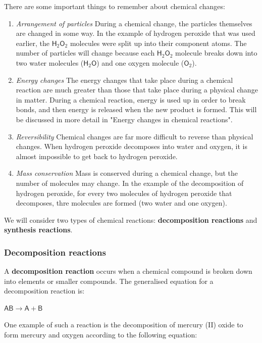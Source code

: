       \label{m38709*id62865}There are some important things to remember about chemical changes:\par 
      \label{m38709*id62869}\begin{enumerate}[noitemsep, label=\textbf{\arabic*}. ] 
            \label{m38709*uid6}\item \textsl{Arrangement of particles}\newline
During a chemical change, the particles themselves are changed in some way. In the example of hydrogen peroxide that was used earlier, the $\mathsf{H}_{2}\mathsf{O}_{2}$ molecules were split up into their component atoms. The number of particles will change because each $\mathsf{H}_{2}\mathsf{O}_{2}$ molecule breaks down into two water molecules ($\mathsf{H}_{2}\mathsf{O}$) and one oxygen molecule ($\mathsf{O}_{2}$).
\label{m38709*uid7}\item \textsl{Energy changes}\newline
The energy changes that take place during a chemical reaction are much greater than those that take place during a physical change in matter. During a chemical reaction, energy is used up in order to break bonds, and then energy is released when the new product is formed. This will be discussed in more detail in "Energy changes in chemical reactions".
\label{m38709*uid8}\item \textsl{Reversibility}\newline
Chemical changes are far more difficult to reverse than physical changes. When hydrogen peroxide decomposes into water and oxygen, it is almost impossible to get back to hydrogen peroxide.
\item \textsl{Mass conservation}\newline
Mass is conserved during a chemical change, but the number of molecules may change. In the example of the decomposition of hydrogen peroxide, for every two molecules of hydrogen peroxide that decomposes, thre molecules are formed (two water and one oxygen).
\end{enumerate}
      \label{m38709*id62997}We will consider two types of chemical reactions: \textbf{decomposition reactions} and \textbf{synthesis reactions}.\par 
      \label{m38709*uid9}
            \subsubsection*{Decomposition reactions}
            \nopagebreak
            \label{m38709*id63019}A \textbf{decomposition reaction} occurs when a chemical compound is broken down into elements or smaller compounds. The generalised equation for a decomposition reaction is:\par 
        \label{m38709*id63029}$\mathsf{AB}\to \mathsf{A}+\mathsf{B}$\par 
        \label{m38709*id63040}One example of such a reaction is the decomposition of mercury (II) oxide to form mercury and oxygen according to the following equation:
\label{m38709*id734}\nopagebreak\noindent{}

